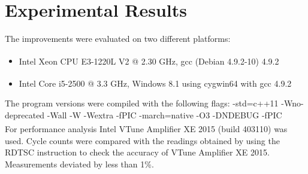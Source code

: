 \section{Experimental Results}\label{sec:results}

 The improvements were evaluated on two different platforms:
\begin{itemize}
\item Intel\textsuperscript{\textregistered} Xeon CPU E3-1220L V2 @ 2.30 GHz, gcc (Debian 4.9.2-10) 4.9.2
\item Intel\textsuperscript{\textregistered} Core i5-2500 @ 3.3 GHz, Windows 8.1 using cygwin64 with gcc 4.9.2
\end{itemize}

The program versions were compiled with the following flags: 
-std=c++11 -Wno-deprecated -Wall -W -Wextra -fPIC -march=native -O3 -DNDEBUG -fPIC
\\
For performance analysis Intel\textsuperscript{\textregistered} VTune Amplifier XE 2015 (build 403110) was used. Cycle counts were compared with the readings obtained by using the RDTSC instruction to check the accuracy of VTune Amplifier XE 2015. Measurements deviated by less than 1\%.

